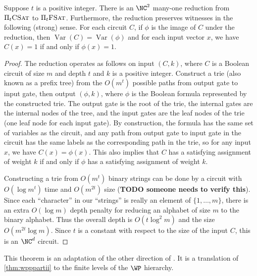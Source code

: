 \documentclass{article}
\newcommand{\todo}[1]{\textbf{TODO #1}}
\newcommand{\PiFSAT}{\Pi_t \textsc{FSat}}
\newcommand{\PiCSAT}{\Pi_t \textsc{CSat}}
\DeclareMathOperator{\Var}{Var}
\begin{document}
\begin{lemma}\label{lem:circuittoformula}
  Suppose $t$ is a positive integer.
  There is an $\NC^2$ many-one reduction from $\PiCSAT$ to $\PiFSAT$.
  Furthermore, the reduction preserves witnesses in the following (strong) sense.
  For each circuit $C$, if $\phi$ is the image of $C$ under the reduction, then $\Var(C) = \Var(\phi)$ and for each input vector $x$, we have $C(x) = 1$ if and only if $\phi(x) = 1$.
\end{lemma}
\begin{proof}
  The reduction operates as follows on input $(C, k)$, where $C$ is a Boolean circuit of size $m$ and depth $t$ and $k$ is a positive integer.
  Construct a trie (also known as a prefix tree) from the $O(m^t)$ possible paths from output gate to input gate, then output $(\phi, k)$, where $\phi$ is the Boolean formula represented by the constructed trie.
  The output gate is the root of the trie, the internal gates are the internal nodes of the tree, and the input gates are the leaf nodes of the trie (one leaf node for each input gate).
  By construction, the formula has the same set of variables as the circuit, and any path from output gate to input gate in the circuit has the same labels as the corresponding path in the trie, so for any input $x$, we have $C(x) = \phi(x)$.
  This also implies that $C$ has a satisfying assignment of weight $k$ if and only if $\phi$ has a satisfying assignment of weight $k$.

  Constructing a trie from $O(m^t)$ binary strings can be done by a circuit with $O(\log m^t)$ time and $O(m^{2t})$ size \autocite{lv86} (\todo{someone needs to verify this}).
  Since each ``character'' in our ``strings'' is really an element of $\{1, \dotsc, m\}$, there is an extra $O(\log m)$ depth penalty for reducing an alphabet of size $m$ to the binary alphabet.
  Thus the overall depth is $O(t \log^2 m)$ and the size $O(m^{2t} \log m)$.
  Since $t$ is a constant with respect to the size of the input $C$, this is an $\NC^d$ circuit.
\end{proof}

This theorem is an adaptation of the other direction of \autocite[Theorem~4.3]{cc97npo}.
It is a translation of \autoref{thm:wpppartii} to the finite levels of the $\WP$ hierarchy.
\end{document}

